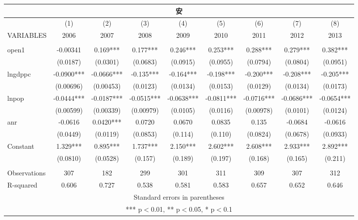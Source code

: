 \documentclass[]{article}
\begin{document}
\begin{tabular}{lcccccccc}
\multicolumn{9}{c}{安} \\ \hline
 & (1) & (2) & (3) & (4) & (5) & (6) & (7) & (8) \\
VARIABLES & 2006 & 2007 & 2008 & 2009 & 2010 & 2011 & 2012 & 2013 \\ \hline
 &  &  &  &  &  &  &  &  \\
open1 & -0.00341 & 0.169*** & 0.177*** & 0.246*** & 0.253*** & 0.288*** & 0.279*** & 0.382*** \\
 & (0.0187) & (0.0301) & (0.0683) & (0.0915) & (0.0955) & (0.0794) & (0.0804) & (0.0951) \\
lngdppc & -0.0900*** & -0.0666*** & -0.135*** & -0.164*** & -0.198*** & -0.200*** & -0.208*** & -0.205*** \\
 & (0.00696) & (0.00453) & (0.0123) & (0.0134) & (0.0153) & (0.0129) & (0.0134) & (0.0173) \\
lnpop & -0.0444*** & -0.0187*** & -0.0515*** & -0.0638*** & -0.0811*** & -0.0716*** & -0.0686*** & -0.0654*** \\
 & (0.00599) & (0.00339) & (0.00979) & (0.0105) & (0.0116) & (0.00978) & (0.0101) & (0.0124) \\
anr & -0.0616 & 0.0420*** & 0.0720 & 0.0670 & 0.0835 & 0.135 & -0.0684 & -0.0616 \\
 & (0.0449) & (0.0119) & (0.0853) & (0.114) & (0.110) & (0.0824) & (0.0678) & (0.0933) \\
Constant & 1.329*** & 0.895*** & 1.737*** & 2.150*** & 2.602*** & 2.608*** & 2.933*** & 2.892*** \\
 & (0.0810) & (0.0528) & (0.157) & (0.189) & (0.197) & (0.168) & (0.165) & (0.211) \\
 &  &  &  &  &  &  &  &  \\
Observations & 307 & 182 & 299 & 301 & 311 & 309 & 307 & 312 \\
 R-squared & 0.606 & 0.727 & 0.538 & 0.581 & 0.583 & 0.657 & 0.652 & 0.646 \\ \hline
\multicolumn{9}{c}{ Standard errors in parentheses} \\
\multicolumn{9}{c}{ *** p$<$0.01, ** p$<$0.05, * p$<$0.1} \\
\end{tabular}
\end{document}
